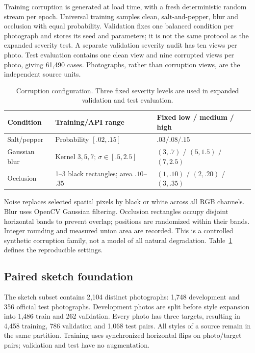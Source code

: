 \documentclass[conference]{IEEEtran}
\begin{document}
Training corruption is generated at load time, with a fresh deterministic random stream per epoch. Universal training samples clean, salt-and-pepper, blur and occlusion with equal probability. Validation fixes one balanced condition per photograph and stores its seed and parameters; it is not the same protocol as the expanded severity test. A separate validation severity audit has ten views per photo. Test evaluation contains one clean view and nine corrupted views per photo, giving 61,490 cases. Photographs, rather than corruption views, are the independent source units.

\begin{table}[t]\centering\caption{Corruption configuration. Three fixed severity levels are used in expanded validation and test evaluation.}\label{tab:corrupt}
\begin{tabular}{p{}p{}p{}}\toprule
Condition & Training/API range & Fixed low / medium / high\\\midrule
Salt/pepper & Probability $[.02,.15]$ & $.03/.08/.15$\\
Gaussian blur & Kernel $3,5,7$; $\sigma\in[.5,2.5]$ & $(3,.7)$ / $(5,1.5)$ / $(7,2.5)$\\
Occlusion & 1--3 black rectangles; area $.10$--$.35$ & $(1,.10)$ / $(2,.20)$ / $(3,.35)$\\\bottomrule
\end{tabular}\end{table}

Noise replaces selected spatial pixels by black or white across all RGB channels. Blur uses OpenCV Gaussian filtering. Occlusion rectangles occupy disjoint horizontal bands to prevent overlap; positions are randomized within their bands. Integer rounding and measured union area are recorded. This is a controlled synthetic corruption family, not a model of all natural degradation. Table~\ref{tab:corrupt} defines the reproducible settings.

\subsection{Paired sketch foundation}
The sketch subset contains 2,104 distinct photographs: 1,748 development and 356 official test photographs. Development photos are split before style expansion into 1,486 train and 262 validation. Every photo has three targets, resulting in 4,458 training, 786 validation and 1,068 test pairs. All styles of a source remain in the same partition. Training uses synchronized horizontal flips on photo/target pairs; validation and test have no augmentation.
\end{document}
